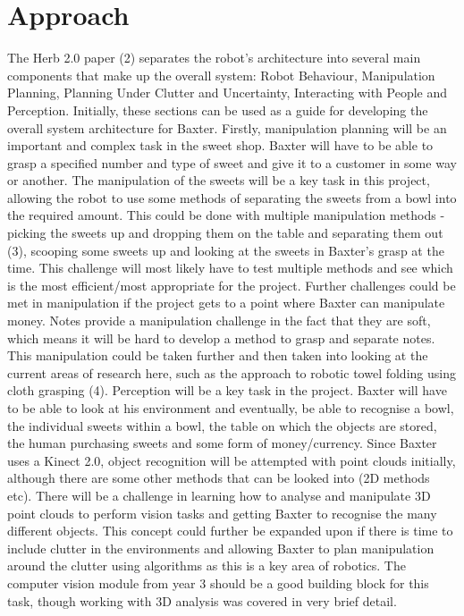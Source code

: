 \section{Approach}
The Herb 2.0 paper (2) separates the robot's architecture into several main components that make up the overall system: Robot Behaviour, Manipulation Planning, Planning Under Clutter and Uncertainty, Interacting with People and Perception. Initially, these sections can be used as a guide for developing the overall system architecture for Baxter.
\newline\newline
Firstly, manipulation planning will be an important and complex task in the sweet shop. Baxter will have to be able to grasp a specified number and type of sweet and give it to a customer in some way or another. The manipulation of the sweets will be a key task in this project, allowing the robot to use some methods of separating the sweets from a bowl into the required amount. This could be done with multiple manipulation methods - picking the sweets up and dropping them on the table and separating them out (3), scooping some sweets up and looking at the sweets in Baxter's grasp at the time. This challenge will most likely have to test multiple methods and see which is the most efficient/most appropriate for the project. Further challenges could be met in manipulation if the project gets to a point where Baxter can manipulate money. Notes provide a manipulation challenge in the fact that they are soft, which means it will be hard to develop a method to grasp and separate notes. This manipulation could be taken further and then taken into looking at the current areas of research here, such as the approach to robotic towel folding using cloth grasping (4).
\newline\newline
Perception will be a key task in the project. Baxter will have to be able to look at his environment and eventually, be able to recognise a bowl, the individual sweets within a bowl, the table on which the objects are stored, the human purchasing sweets and some form of money/currency. Since Baxter uses a Kinect 2.0, object recognition will be attempted with point clouds initially, although there are some other methods that can be looked into (2D methods etc). There will be a challenge in learning how to analyse and manipulate 3D point clouds to perform vision tasks and getting Baxter to recognise the many different objects. This concept could further be expanded upon if there is time to include clutter in the environments and allowing Baxter to plan manipulation around the clutter using algorithms as this is a key area of robotics. The computer vision module from year 3 should be a good building block for this task, though working with 3D analysis was covered in very brief detail.
